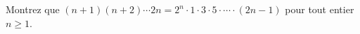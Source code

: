 Montrez que $(n+1)(n+2)\cdots 2n = 2^n \cdot 1 \cdot 3 \cdot 5 \cdot \cdots \cdot (2n-1)$
pour tout entier $n \geq 1$.
